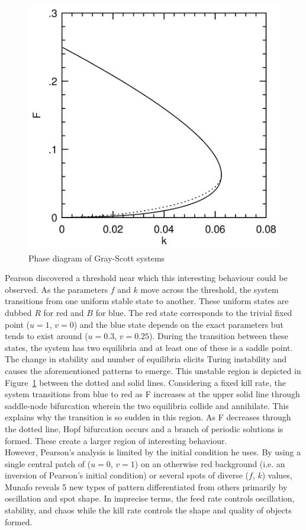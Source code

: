 \begin{figure}[!h]
\centering
\includegraphics[width=.45\textwidth]{images/pearson-threshold.png}
\caption{Phase diagram of Gray-Scott systems\cite{pearson1993complex}}
\label{fig:pearsons-threshold}
\end{figure}

Pearson discovered a threshold near which this interesting behaviour could be observed. As the parameters $f$ and $k$ move across the threshold, the system transitions from one uniform stable state to another. These uniform states are dubbed $R$ for red and $B$ for blue. The red state corresponds to the trivial fixed point ($u = 1$, $v = 0$) and the blue state depends on the exact parameters but tends to exist around ($u = 0.3$, $v = 0.25$). During the transition between these states, the system has two equilibria and at least one of these is a saddle point. The change in stability and number of equilibria elicits Turing instability and causes the aforementioned patterns to emerge. This unstable region is depicted in Figure~\ref{fig:pearsons-threshold} between the dotted and solid lines. Considering a fixed kill rate, the system transitions from blue to red as F increases at the upper solid line through saddle-node bifurcation wherein the two equilibria collide and annihilate. This explains why the transition is so sudden in this region. As F decreases through the dotted line, Hopf bifurcation occurs and a branch of periodic solutions is formed. These create a larger region of interesting behaviour.\\

However, Pearson's analysis is limited by the initial condition he uses. By using a single central patch of ($u = 0$, $v=1$) on an otherwise red background (i.e. an inversion of Pearson's initial condition) or several spots of diverse ($f$, $k$) values, Munafo\cite{munafo2014stable} reveals 5 new types of pattern differentiated from others primarily by oscillation and spot shape. In imprecise terms, the feed rate controls oscillation, stability, and chaos while the kill rate controls the shape and quality of objects formed.\\

